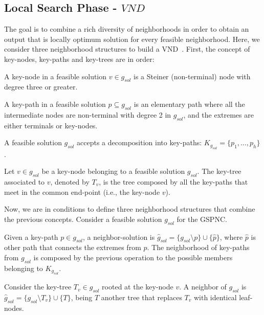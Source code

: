 \documentclass{llncs}
\begin{document}
\subsection{Local Search Phase - $VND$}
The goal is to combine a rich diversity of neighborhoods in order to obtain an output that is locally optimum solution for every feasible neighborhood. Here, we consider three neighborhood structures to build a VND~\cite{50}.  
First, the concept of key-nodes, key-paths and key-trees are in order: 
\begin{definition}
A key-node in a feasible solution $v \in g_{sol}$ is a Steiner (non-terminal) node with degree three or greater.
\end{definition}

\begin{definition}
A key-path in a feasible solution $p \subseteq g_{sol}$ is an elementary path 
where all the intermediate nodes are non-terminal with degree 2 in $g_{sol}$, 
and the extremes are either terminals or key-nodes.
\end{definition}

A feasible solution $g_{sol}$ accepts a decomposition into key-paths: $K_{g_{sol}}=\{p_1,\ldots,p_h\}$. 
 
\begin{definition}
Let $v \in g_{sol}$ be a key-node belonging to a feasible solution $g_{sol}$. 
The key-tree associated to $v$, denoted by $T_v$, is the tree composed by all the 
key-paths that meet in the common end-point (i.e., the key-node $v$).
\end{definition}

Now, we are in conditions to define three neighborhood structures that combine the previous concepts. 
Consider a feasible solution $g_{sol}$ for the GSPNC. 

\begin{definition}
Given a key-path $p \in g_{sol}$, a neighbor-solution is 
${\hat{g}}_{sol} = \{g_{sol} \setminus p \} \cup \{\hat{p}\}$, 
where $\hat{p}$ is other path that connects the extremes from $p$.  
The neighborhood of key-paths from $g_{sol}$ is composed by the previous operation 
to the possible members belonging to $K_{g_{sol}}$. 
\end{definition}

\begin{definition}
Consider the key-tree $T_v \in g_{sol}$ rooted at the key-node $v$.  
A neighbor of $g_{sol}$ is $\hat{g}_{sol} = \{ g_{sol}\setminus T_v \} \cup \{T\}$, being 
$T$ another tree that replaces $T_v$ with identical leaf-nodes. 
\end{definition}
\end{document}
